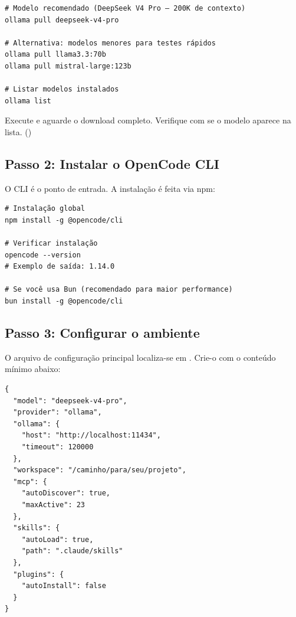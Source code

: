 \begin{lstlisting}[style=bashstyle, caption={Download de modelo LLM},
label={lst:pull-model}]
# Modelo recomendado (DeepSeek V4 Pro — 200K de contexto)
ollama pull deepseek-v4-pro

# Alternativa: modelos menores para testes rápidos
ollama pull llama3.3:70b
ollama pull mistral-large:123b

# Listar modelos instalados
ollama list
\end{lstlisting}

\begin{exercicio}
Execute  e aguarde o download
completo. Verifique com  se o modelo aparece na
lista. (\nivelzero)
\end{exercicio}

\subsection{Passo 2: Instalar o OpenCode CLI}
\label{subsec:passo2}

O \opencode{} CLI é o ponto de entrada. A instalação é feita via npm:

\begin{lstlisting}[style=bashstyle, caption={Instalação do OpenCode CLI},
label={lst:install-cli}]
# Instalação global
npm install -g @opencode/cli

# Verificar instalação
opencode --version
# Exemplo de saída: 1.14.0

# Se você usa Bun (recomendado para maior performance)
bun install -g @opencode/cli
\end{lstlisting}

\subsection{Passo 3: Configurar o ambiente}
\label{subsec:passo3}

O arquivo de configuração principal localiza-se em
. Crie-o com o
conteúdo mínimo abaixo:

\begin{lstlisting}[style=pythonstyle, caption={Configuração mínima do
OpenCode Ecosystem}, label={lst:config}]
{
  "model": "deepseek-v4-pro",
  "provider": "ollama",
  "ollama": {
    "host": "http://localhost:11434",
    "timeout": 120000
  },
  "workspace": "/caminho/para/seu/projeto",
  "mcp": {
    "autoDiscover": true,
    "maxActive": 23
  },
  "skills": {
    "autoLoad": true,
    "path": ".claude/skills"
  },
  "plugins": {
    "autoInstall": false
  }
}
\end{lstlisting}


